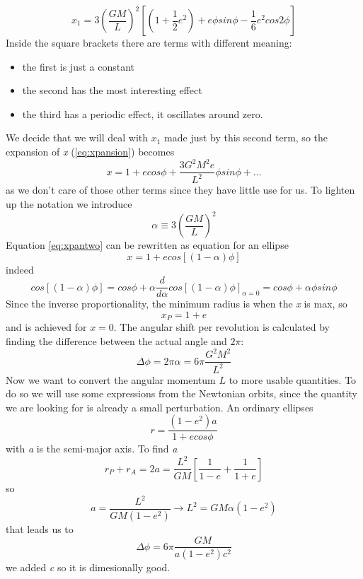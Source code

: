 \begin{equation}
x_{1} = 3 \left( \frac{GM}{L} \right)^{2}  \left[ \left( 1+ \frac{1}{2}e^{2} \right) + e\phi sin\phi - \frac{1}{6}e^{2}cos2\phi  \right]
\end{equation}
Inside the square brackets there are terms with different meaning:
\begin{itemize}
\item the first is just a constant
\item the second has the most interesting effect
\item the third has a periodic effect, it oscillates around zero.
\end{itemize}
We decide that we will deal with $x_{1}$ made just by this second term, so the expansion of \emph{x} (\ref{eq:xpansion}) becomes
\begin{equation}\label{eq:xpantwo}
x = 1 + ecos\phi + \frac{3G^{2}M^{2}e}{L^{2}}\phi sin\phi + \ldots 
\end{equation}
as we don't care of those other terms since they have little use for us. To lighten up the notation we introduce
\[
\alpha \equiv 3 \left( \frac{GM}{L} \right)^{2}
\]
Equation \ref{eq:xpantwo} can be rewritten as equation for an ellipse
\begin{equation}
x = 1 + ecos\left[ \left( 1-\alpha  \right)\phi  \right]
\end{equation}
indeed
\[
cos\left[ \left( 1-\alpha  \right)\phi  \right] = cos\phi  + \alpha \frac{d }{d \alpha }cos\left[ \left( 1-\alpha  \right)\phi  \right]_{\alpha =0} = cos\phi + \alpha \phi sin \phi 
\]
Since the inverse proportionality, the minimum radius is when the \emph{x} is max, so
\[
x_{P} = 1 +e
\]
and is achieved for $x=0$. The angular shift per revolution is calculated by finding the difference between the actual angle and $2\pi $:
\[
\Delta \phi = 2\pi \alpha = 6\pi \frac{G^{2}M^{2}}{L^{2}}
\]
Now we want to convert the angular momentum $L$ to more usable quantities. To do so we will use some expressions from the Newtonian orbits, since the quantity we are looking for is already a small perturbation. An ordinary ellipses
\[
r = \frac{\left( 1-e^{2} \right)a}{1+ecos\phi }
\]
with \emph{a} is the semi-major axis. To find \emph{a}
\[
r_{P} +r_{A} = 2a = \frac{L^{2}}{GM}\left[ \frac{1}{1-e} + \frac{1}{1+e} \right]
\]
so 
\[
a = \frac{L^{2}}{GM \left( 1-e^{2} \right)} \to  L^{2 }= GM\alpha \left( 1-e^{2} \right)
\]
that leads us to
\begin{equation}
\Delta \phi  = 6\pi \frac{GM}{a\left( 1-e^{2} \right)c^{2}}
\end{equation}
we added \emph{c} so it is dimesionally good.

